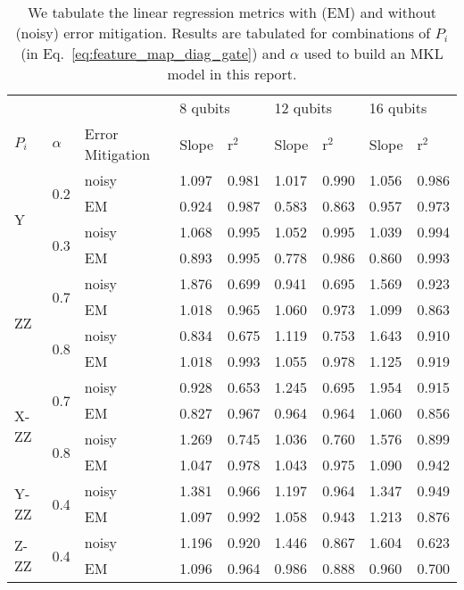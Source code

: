 \documentclass[reprint,amsfonts, amssymb, amsmath,  showkeys, nofootinbib,pra, superscriptaddress, twocolumn,longbibliography]{revtex4-2}
\begin{document}
\begin{table*}
    \centering
    \begin{tabular}{|l|l|l|ll|ll|ll|}
        \hline
        ~ & ~ & ~ & \multicolumn{2}{l|}{8 qubits} & \multicolumn{2}{l|}{12 qubits} & \multicolumn{2}{l|}{16 qubits} \\
        \cline{4-9}
        $P_i$ & $\alpha$ & Error Mitigation & Slope & r$^2$ & Slope & r$^2$ & Slope & r$^2$ \\ \hline
        \multirow{4}{*}{Y} & \multirow{2}{*}{0.2} & noisy & 1.097 & 0.981 & 1.017 & 0.990 & 1.056 & 0.986 \\ \cline{3-9}
        ~ & ~ & EM & 0.924 & 0.987 & 0.583 & 0.863 & 0.957 & 0.973 \\ \cline{2-9}
        ~ & \multirow{2}{*}{0.3} & noisy & 1.068 & 0.995 & 1.052 & 0.995 & 1.039 & 0.994 \\ \cline{3-9}
        ~ & ~ & EM & 0.893 & 0.995 & 0.778 & 0.986 & 0.860 & 0.993 \\ \cline{1-9}
        \multirow{4}{*}{ZZ} & \multirow{2}{*}{0.7} & noisy & 1.876 & 0.699 & 0.941 & 0.695 & 1.569 & 0.923 \\ \cline{3-9}
        ~ & ~ & EM & 1.018 & 0.965 & 1.060 & 0.973 & 1.099 & 0.863 \\ \cline{2-9}
        ~ & \multirow{2}{*}{0.8} & noisy & 0.834 & 0.675 & 1.119 & 0.753 & 1.643 & 0.910 \\ \cline{3-9}
        ~ & ~ & EM & 1.018 & 0.993 & 1.055 & 0.978 & 1.125 & 0.919 \\ \cline{1-9}
        \multirow{4}{*}{X-ZZ} & \multirow{2}{*}{0.7} & noisy & 0.928 & 0.653 & 1.245 & 0.695 & 1.954 & 0.915 \\ \cline{3-9}
        ~ & ~ & EM & 0.827 & 0.967 & 0.964 & 0.964 & 1.060 & 0.856 \\ \cline{2-9}
        ~ & \multirow{2}{*}{0.8} & noisy & 1.269 & 0.745 & 1.036 & 0.760 & 1.576 & 0.899 \\ \cline{3-9}
        ~ & ~ & EM & 1.047 & 0.978 & 1.043 & 0.975 & 1.090 & 0.942 \\ \cline{1-9}
        \multirow{2}{*}{Y-ZZ} & \multirow{2}{*}{0.4} & noisy & 1.381 & 0.966 & 1.197 & 0.964 & 1.347 & 0.949 \\ \cline{3-9}
        ~ & ~ & EM & 1.097 & 0.992 & 1.058 & 0.943 & 1.213 & 0.876 \\ \cline{1-9}
        \multirow{2}{*}{Z-ZZ} & \multirow{2}{*}{0.4} & noisy & 1.196 & 0.920 & 1.446 & 0.867 & 1.604 & 0.623 \\ \cline{3-9}
        ~ & ~ & EM & 1.096 & 0.964 & 0.986 & 0.888 & 0.960 & 0.700 \\ \hline
    \end{tabular}
    \caption{
    We tabulate the linear regression metrics with (EM) and without (noisy) error mitigation. Results are tabulated for combinations of $P_i$ (in Eq.~\ref{eq:feature_map_diag_gate}) and $\alpha$ used to build an MKL model in this report.
    }
    \label{table:mkl_linear_fit}
\end{table*}
\end{document}
